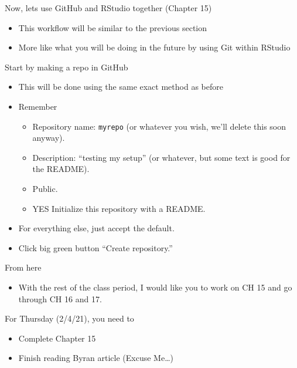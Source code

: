 \documentclass[
  ignorenonframetext,
]{beamer}
\providecommand{\tightlist}{%
  \setlength{\itemsep}{0pt}\setlength{\parskip}{0pt}}
\begin{document}
\begin{frame}{Now, lets use GitHub and RStudio together (Chapter 15)}
\protect\hypertarget{now-lets-use-github-and-rstudio-together-chapter-15}{}

\begin{itemize}
\tightlist
\item
  This workflow will be similar to the previous section
\item
  More like what you will be doing in the future by using Git within
  RStudio
\end{itemize}

\end{frame}

\begin{frame}[fragile]{Start by making a repo in GitHub}
\protect\hypertarget{start-by-making-a-repo-in-github}{}

\begin{itemize}
\tightlist
\item
  This will be done using the same exact method as before
\item
  Remember

  \begin{itemize}
  \tightlist
  \item
    Repository name: \texttt{myrepo} (or whatever you wish, we'll delete
    this soon anyway).
  \item
    Description: ``testing my setup'' (or whatever, but some text is
    good for the README).
  \item
    Public.
  \item
    YES Initialize this repository with a README.
  \end{itemize}
\item
  For everything else, just accept the default.
\item
  Click big green button ``Create repository.''
\end{itemize}

\end{frame}

\begin{frame}{From here}
\protect\hypertarget{from-here}{}

\begin{itemize}
\tightlist
\item
  With the rest of the class period, I would like you to work on CH 15
  and go through CH 16 and 17.
\end{itemize}

For Thursday (2/4/21), you need to

\begin{itemize}
\tightlist
\item
  Complete Chapter 15
\item
  Finish reading Byran article (Excuse Me\ldots{})
\end{itemize}

\end{frame}
\end{document}
